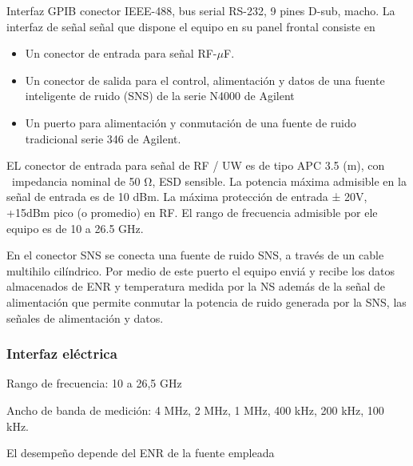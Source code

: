 Interfaz GPIB conector IEEE-488, bus serial RS-232, 9 pines D-sub, macho.	
La interfaz de señal señal que dispone el equipo en su panel frontal consiste en 

\begin{itemize}
	\item Un conector de entrada para señal RF-$\mu${\textmu}F. 
	\item Un conector de salida para el control, alimentación y datos de una fuente inteligente de ruido (SNS) de la serie N4000 de Agilent 
	\item Un puerto para alimentación y conmutación de una fuente de ruido tradicional serie 346 de Agilent. 
\end{itemize}
EL conector de entrada para señal de RF / UW es de tipo APC 3.5 (m), con \ impedancia nominal de 50 Ω, ESD sensible. La potencia máxima admisible en la señal de entrada es de 10 dBm. La máxima protección de entrada ± 20V, +15dBm pico (o promedio) en RF. El rango de frecuencia admisible por ele equipo es de 10 a 26.5 GHz.

En el conector SNS se conecta una fuente de ruido SNS, a través de un cable multihilo cilíndrico. Por medio de este puerto el equipo enviá y recibe los datos almacenados de ENR y temperatura medida por la NS además de la señal de alimentación que permite conmutar la potencia de ruido generada por la SNS, las señales de alimentación y datos. 

\subsubsection{Interfaz eléctrica}

Rango de frecuencia: 10 a 26,5 GHz

Ancho de banda de medición: 4 MHz, 2 MHz, 1 MHz, 400 kHz, 200 kHz, 100 kHz.

El desempeño depende del ENR de la fuente empleada	

